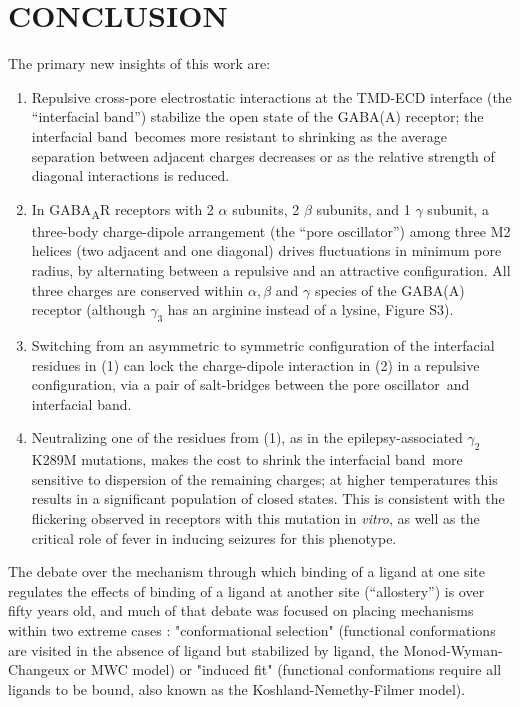 \documentclass[journal=jacsat,manuscript=article]{achemso}
\newcommand{\sfigAlignment}{S3}
\newcommand{\GABAA}{GABA\textsubscript{A}R\xspace}
\newcommand{\fivering}{interfacial band~}
\newcommand{\fiveringnos}{interfacial band}
\newcommand{\triad}{pore oscillator~}
\newcommand{\triadns}{pore oscillator}
\begin{document}
\section*{CONCLUSION}
The primary new insights of this work are:  
\begin{enumerate}
\item Repulsive cross-pore electrostatic interactions at the TMD-ECD interface (the ``\fiveringnos'') stabilize the open state of the GABA(A) receptor; the \fivering becomes more resistant to shrinking as the average separation between adjacent charges decreases or as the relative strength of diagonal interactions is reduced. 
\item In \GABAA receptors with 2 $\alpha$ subunits, 2 $\beta$ subunits, and 1 $\gamma$ subunit, a three-body charge-dipole arrangement (the ``\triadns'') among three M2 helices (two adjacent and one diagonal) %
drives fluctuations in minimum pore radius, by alternating between a repulsive and an attractive configuration.  All three charges are conserved within $\alpha, \beta$ and $\gamma$ species of the GABA(A) receptor (although $\gamma_3$ has an arginine instead of a lysine, Figure \sfigAlignment).
\item Switching from an asymmetric to symmetric configuration of the interfacial residues in (1) can lock the charge-dipole interaction in (2) in a repulsive configuration, via a pair of salt-bridges between the \triad and \fiveringnos.   
\item Neutralizing one of the residues from (1), as in the epilepsy-associated $\gamma_{2}$K289M mutations, makes the cost to shrink the \fivering more sensitive to dispersion of the remaining charges; at higher temperatures this results in a significant population of closed states.  This is consistent with the flickering observed in receptors with this mutation in {\it vitro}, as well as the critical role of fever in inducing seizures for this phenotype. 
\end{enumerate}

The debate over the mechanism through which binding of a ligand at one site regulates the effects of binding of a ligand at another site (``allostery'') is over fifty years old,\cite{Changeux2011,Changeux2016} %
 and much of that debate was focused on placing mechanisms within two extreme cases :  "conformational selection" (functional conformations are visited in the absence of ligand but stabilized by ligand, the Monod-Wyman-Changeux or MWC model)  or "induced fit"   (functional conformations require all ligands to be bound, also known as the Koshland-Nemethy-Filmer model).  
 
\end{document}

